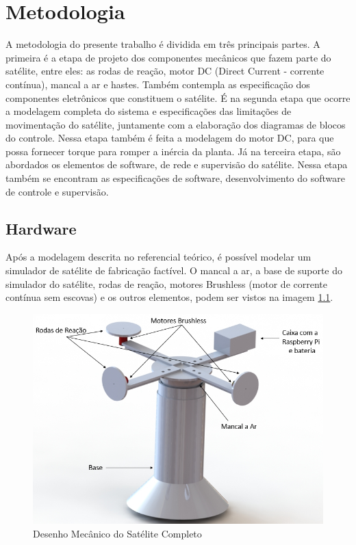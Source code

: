 \chapter{Metodologia}

A metodologia do presente trabalho é dividida em três principais partes. A primeira é a etapa de projeto dos componentes mecânicos que fazem parte do satélite, entre eles: as rodas de reação, motor DC (Direct Current - corrente contínua), mancal a ar e hastes. Também contempla as especificação dos componentes eletrônicos que constituem o satélite. É na segunda etapa que ocorre a modelagem completa do sistema e especificações das limitações de movimentação do satélite, juntamente com a elaboração dos diagramas de blocos do controle. Nessa etapa também é feita a modelagem do motor DC, para que possa fornecer torque para romper a inércia da planta. Já na terceira etapa, são abordados os elementos de software, de rede e supervisão do satélite. Nessa etapa também se encontram as especificações de software, desenvolvimento do software de controle e supervisão.

\section{Hardware}

Após a modelagem descrita no referencial teórico, é possível modelar um simulador de satélite de fabricação factível.  O mancal a ar, a base de suporte do simulador do satélite, rodas de reação, motores Brushless (motor de corrente contínua sem escovas) e os outros elementos, podem ser vistos na imagem \ref{fig:satelite_completo}.

\begin{figure}[H]
  \caption{Desenho Mecânico do Satélite Completo}
  \begin{center}
      \includegraphics[scale=.6]{img/satelite_completo}
  \end{center}
  \label{fig:satelite_completo}
\end{figure}

